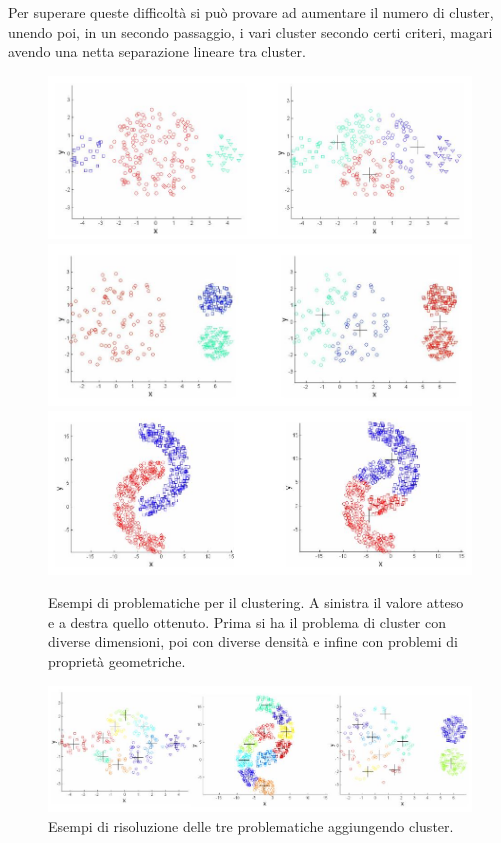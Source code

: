 \documentclass[a4paper,12pt, oneside]{book}
\begin{document}
Per superare queste difficoltà si può provare ad aumentare il numero di cluster,
unendo poi, in un secondo passaggio, i vari cluster secondo certi criteri,
magari avendo una netta separazione lineare tra cluster.\\
\begin{figure}
  \centering
  \includegraphics[scale = 0.4]{img/clu1.jpg}
  \includegraphics[scale = 0.4]{img/clu2.jpg}
  \includegraphics[scale = 0.4]{img/clu3.jpg}
  \caption{Esempi di problematiche per il clustering. A sinistra il valore
    atteso e a destra quello ottenuto. Prima si ha il problema di cluster con
    diverse dimensioni, poi con diverse densità e infine con problemi di
    proprietà geometriche.}
\end{figure}
\begin{figure}
  \centering
  \includegraphics[scale = 0.4]{img/clusol.jpg}
  \caption{Esempi di risoluzione delle tre problematiche aggiungendo cluster.}
\end{figure}
\end{document}

